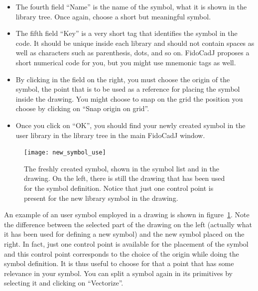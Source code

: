 \documentclass[10pt,a4paper,twoside]{scrreprt}
\begin{document}
\begin{itemize}
\item The fourth field ``Name'' is the name of the symbol, what it is shown in the library tree. Once again, choose a short but meaningful symbol.
\item The fifth field ``Key'' is a very short tag that identifies the symbol in the code. It should be unique inside each library and should not contain spaces as well as characters such as parenthesis, dots, and so on. FidoCadJ proposes a short numerical code for you, but you might use mnemonic tags as well.
\item By clicking in the field on the right, you must choose the origin of the symbol, the point that is to be used as a reference for placing the symbol inside the drawing. You might choose to snap on the grid the position you choose by clicking on ``Snap origin on grid''.
\item Once you click on ``OK'', you should find your newly created symbol in the user library in the library tree in the main FidoCadJ window.
\end{itemize}
\begin{figure}
  \texttt{[image: new\_symbol\_use]}
  \caption{The freshly created symbol, shown in the symbol list and in the drawing. On the left, there is still the drawing that has been used for the symbol definition. Notice that just one control point is present for the new library symbol in the drawing.}
  \label{fig_new_symbol_use}
\end{figure}
An example of an user symbol employed in a drawing is shown in figure~\ref{fig_new_symbol_use}. Note the difference between the selected part of the drawing on the left (actually what it has been used for defining a new symbol) and the new symbol placed on the right.
In fact, just one control point is available for the placement of the symbol and this control point corresponds to the choice of the origin while doing the symbol definition. It is thus useful to choose for that a point that has some relevance in your symbol.
You can split a symbol again in its primitives by selecting it and clicking on ``Vectorize''.
\end{document}
